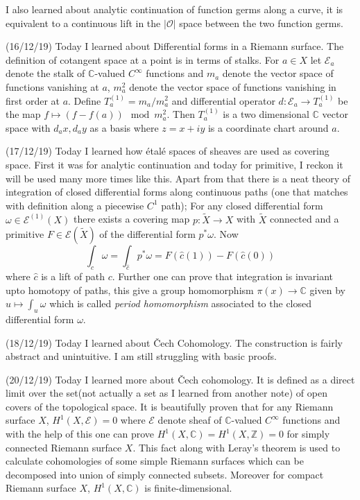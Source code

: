 \documentclass[12pt,a4paper]{article}
\begin{document}
I also learned about analytic continuation of function germs along a curve, it is equivalent to a continuous lift in the $|\mathcal{O}|$ space between the two function germs.

(16/12/19) Today I learned about Differential forms in a Riemann surface. The definition of cotangent space at a point is in terms of stalks. For $a\in X$ let $\mathcal{E}_a$ denote the stalk of $\mathbb{C}$-valued $C^{\infty}$ functions and $m_a$ denote the vector space of functions vanishing at $a$, $m_a^2$ denote the vector space of functions vanishing in first order at $a$. Define $T^{(1)}_a=m_a/m_a^2$ and differential operator $d : \mathcal{E}_a \to T^{(1)}_a$ be the map $f \mapsto (f-f(a)) \mod m_a^2$. Then $T^{(1)}_a$ is a two dimensional $\mathbb{C}$ vector space with $d_ax,d_ay$ as a basis where $z=x+iy$ is a coordinate chart around $a$.

(17/12/19) Today I learned how \'{e}tal\'{e} spaces of sheaves are used as covering space. First it was for analytic continuation and today for primitive, I reckon it will be used many more times like this.
Apart from that there is a neat theory of integration of closed differential forms along continuous paths (one that matches with definition along a piecewise $C^1$ path); For any closed differential form $\omega \in \mathcal{E}^{(1)}(X)$ there exists a covering map $p:\tilde{X} \to X$ with $\tilde{X}$ connected and a primitive $F\in \mathcal{E}(\tilde{X})$ of the differential form $p^*\omega$. Now \[\int_c \omega =\int_{\hat{c}} p^*\omega =  F(\hat{c}(1))-F(\hat{c}(0)) \]
where $\hat{c}$ is a lift of path $c$. Further one can prove that integration is invariant upto homotopy of paths, this give a group homomorphism $\pi (x) \to \mathbb{C}$ given by $u \mapsto \int_u \omega$ which is called \textit{period homomorphism} associated to the closed differential form $\omega$.

(18/12/19) Today I learned about \v{C}ech Cohomology. The construction is fairly abstract and unintuitive. I am still struggling with basic proofs.

(20/12/19) Today I learned more about \v{C}ech cohomology. It is defined as a direct limit over the set(not actually a set as I learned from another note) of open covers of the topological space. It is beautifully proven that for any Riemann surface $X$, $H^1(X,\mathcal{E})=0$ where $\mathcal{E}$ denote sheaf of  $\mathbb{C}$-valued $C^{\infty}$  functions and with the help of this one can prove  $H^1(X,\mathbb{C})=H^1(X,\mathbb{Z})=0$ for simply connected Riemann surface $X$. This fact along with Leray's theorem is used to calculate cohomologies of some simple Riemann surfaces which can be decomposed into union of simply connected subsets. Moreover for compact Riemann surface $X$, $H^1(X,\mathbb{C})$ is finite-dimensional.
\end{document}

